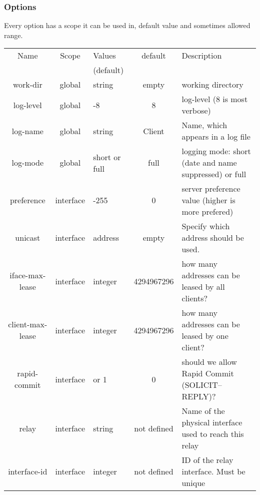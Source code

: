 \subsubsection{Options}

Every option has a scope it can be used in, default value and
sometimes allowed range.

\begin{tabular}{|c|c|>{\centering}p{1.7cm}<{}|c|p{6cm}|}
\hline
Name             & Scope   & Values      & default    & Description \\
                 &         & (default)   &  & \\
\hline
work-dir         & global  & string      & empty      & working directory \\
log-level        & global  & 1-8         & 8          & log-level (8 is most verbose) \\
log-name         & global  & string      & Client     & Name, which appears in a log file\\
log-mode         & global  &short or full& full       & logging mode: short (date and name suppressed) or full \\

preference       &interface& 0-255       & 0          & server preference value (higher is more prefered) \\
unicast          &interface& address     & empty      & Specify which address should be used. \\
iface-max-lease  &interface& integer     & 4294967296 & how many addresses can be leased by all clients? \\
client-max-lease &interface& integer     & 4294967296 & how many addresses can be leased by one client? \\
rapid-commit     &interface& 0 or 1      & 0          & should we allow Rapid Commit (SOLICIT--REPLY)? \\
relay            &interface& string      & not defined& Name of the physical interface used to reach this relay \\
interface-id     &interface& integer     & not defined& ID of the relay interface. Must be unique \\


\end{tabular}
